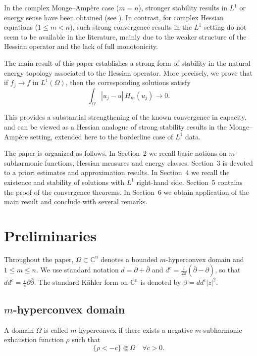 \documentclass[11pt,reqno]{amsart}
\theoremstyle{definition}
\theoremstyle{remark}
\newcommand{\ddc}{dd^c}
\begin{document}
	In the complex Monge--Amp\`ere case ($m=n$), stronger stability results in $L^1$ or energy sense have been obtained (see \cite{DinewPlis, Liu-Zhang}). In contrast, for complex Hessian equations ($1 \le m < n$), such strong convergence results in the $L^1$ setting do not seem to be available in the literature, mainly due to the weaker structure of the Hessian operator and the lack of full monotonicity.
	
	The main result of this paper establishes a strong form of stability in the natural energy topology associated to the Hessian operator. More precisely, we prove that if $f_j \to f$ in $L^1(\Omega)$, then the corresponding solutions satisfy
	\[
	\int_\Omega |u_j - u| \, H_m(u_j) \longrightarrow 0.
	\]
	
	This provides a substantial strengthening of the known convergence in capacity, and can be viewed as a Hessian analogue of strong stability results in the Monge--Amp\`ere setting, extended here to the borderline case of $L^1$ data.
	
	
	The paper is organized as follows.
	In Section~2 we recall basic notions on $m$-subharmonic functions, Hessian measures and energy classes.
	Section~3 is devoted to a priori estimates and approximation results.
	In Section~4 we recall the existence and stability of solutions with $L^1$ right-hand side.
	Section~5 contains the proof of the   convergence theorems. 	In Section~6 we obtain application of the main result and conclude with several remarks.
	
	
	
	\section{Preliminaries}
	
	Throughout the paper, $\Omega \subset \mathbb{C}^n$ denotes a bounded $m$-hyperconvex domain and $1 \le m \le n$.
	We use standard notation $d = \partial + \bar\partial$ and $d^c = \frac{i}{2\pi}(\bar\partial - \partial)$, so that $\ddc = \frac{i}{\pi}\partial\bar\partial$.
	The standard K\"ahler form on $\mathbb{C}^n$ is denoted by $\beta = \ddc |z|^2$.
	
	\subsection{$m$-hyperconvex domain }
	A domain $\Omega$ is called $m$-hyperconvex if there exists 
	a negative $m$-subharmonic exhaustion function $\rho$ such that 
	\[
	\{ \rho < -c \} \Subset \Omega \quad \forall c>0.
	\]
\end{document}
